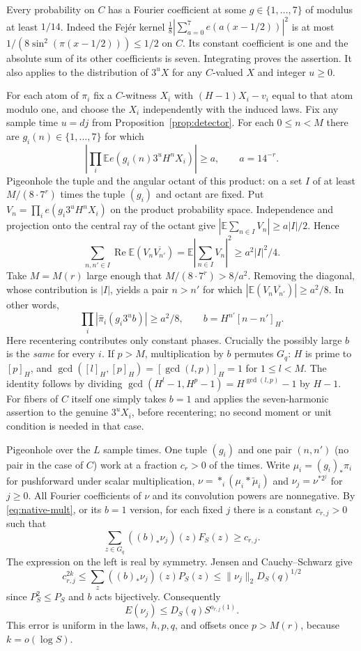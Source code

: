 Every probability on $C$ has a Fourier coefficient at some
$g\in\{1,\ldots,7\}$ of modulus at least $1/14$. Indeed the Fej\'er
kernel $\tfrac18|\sum_{a=0}^7e(a(x-1/2))|^2$ is at most
$1/(8\sin^2(\pi(x-1/2)))\le1/2$ on $C$. Its constant coefficient
is one and the absolute sum of its other coefficients is seven. Integrating
proves the assertion. It also applies to the distribution of $3^u X$
for any $C$-valued $X$ and integer $u\ge0$.

For each atom of $\pi_i$ fix a $C$-witness $X_i$ with
$(H-1)X_i-v_i$ equal to that atom modulo one, and choose the $X_i$
independently with the induced laws. Fix any sample time $u=dj$ from
Proposition~\ref{prop:detector}. For each $0\le n<M$ there are
$g_i(n)\in\{1,\ldots,7\}$ for which
\[
 \left|\prod_i \mathbb E e(g_i(n)3^u H^n X_i)\right|\ge a,
 \qquad a=14^{-r}.
\]
Pigeonhole the tuple and the angular octant of this product: on a set
$I$ of at least $M/(8\cdot7^r)$ times the tuple $(g_i)$ and octant
are fixed. Put $V_n=\prod_i e(g_i3^uH^n X_i)$ on the product probability
space. Independence and projection onto the central ray of the octant
give $|\mathbb E\sum_{n\in I}V_n|\ge a|I|/2$. Hence
\[
 \sum_{n,n'\in I}\operatorname{Re}\mathbb E(V_n\overline{V_{n'}})
 = \mathbb E\left|\sum_{n\in I}V_n\right|^2\ge a^2|I|^2/4.
\]
Take $M=M(r)$ large enough that $M/(8\cdot7^r)>8/a^2$. Removing
the diagonal, whose contribution is $|I|$, yields a pair $n>n'$
for which $|\mathbb E(V_n\overline{V_{n'}})|\ge a^2/8$. In other
words,
\begin{equation}\label{eq:native-mult}
 \prod_i |\widehat\pi_i(g_i3^u b)|\ge a^2/8,
 \qquad b=H^{n'}[n-n']_H .
\end{equation}
Here recentering contributes only constant phases. Crucially the
possibly large $b$ is the \emph{same} for every $i$. If $p>M$,
multiplication by $b$ permutes $G_q$: $H$ is prime to $[p]_H$, and
$\gcd([l]_H,[p]_H)=[\gcd(l,p)]_H=1$ for $1\le l<M$.
The identity follows by dividing
$\gcd(H^l-1,H^p-1)=H^{\gcd(l,p)}-1$ by $H-1$.
For fibers of $C$ itself one simply takes $b=1$ and applies the
seven-harmonic assertion to the genuine $3^u X_i$, before recentering;
no second moment or unit condition is needed in that case.

Pigeonhole over the $L$ sample times. One tuple $(g_i)$ and one pair
$(n,n')$ (no pair in the case of $C$) work at a fraction
$c_r>0$ of the times. Write $\mu_i=(g_i)_*\pi_i$ for pushforward
under scalar multiplication, $\nu=\mathop{*}_i
(\mu_i*\widetilde\mu_i)$ and $\nu_j=\nu^{*2^j}$ for $j\ge0$.
All Fourier coefficients of \(\nu\) and its convolution powers are nonnegative. By
\eqref{eq:native-mult}, or its $b=1$ version, for each fixed $j$
there is a constant $c_{r,j}>0$ such that
\[
 \sum_{z\in G_q} ((b)_*\nu_j)(z)F_S(z)\ge c_{r,j}.
\]
The expression on the left is real by symmetry. Jensen and
Cauchy--Schwarz give
\[
 c_{r,j}^{2k}\le \sum_z ((b)_*\nu_j)(z) P_S(z)
 \le \|\nu_j\|_2 D_S(q)^{1/2}
\]
since $P_S^2\le P_S$ and $b$ acts bijectively. Consequently
\begin{equation}\label{eq:native-scaled}
 E(\nu_j)\le D_S(q)S^{o_{r,j}(1)}.
\end{equation}
This error is uniform in the laws, $h,p,q$, and offsets once $p>M(r)$,
because $k=o(\log S)$.

